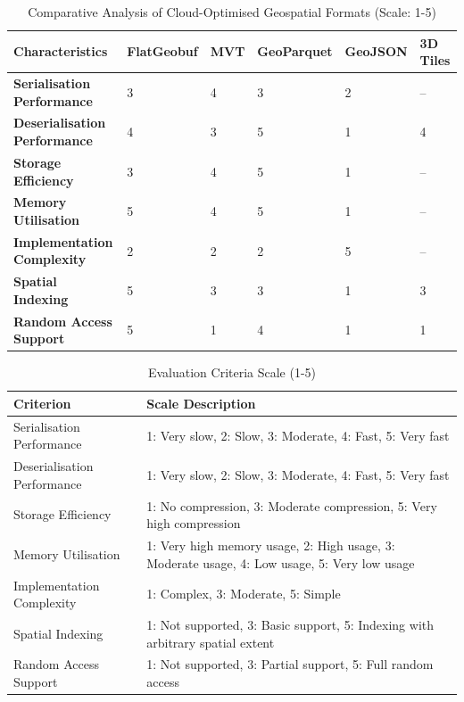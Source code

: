 \begin{table}[htbp]
  \centering
  \caption{Comparative Analysis of Cloud-Optimised Geospatial Formats (Scale: 1-5)}
  \label{tab:format-comparison}
  \footnotesize
  \begin{tabular}{p{3cm}|p{1.8cm}|p{1.8cm}|p{1.8cm}|p{1.8cm}|p{1.8cm}}
    \hline
    \textbf{Characteristics} & \textbf{FlatGeobuf} & \textbf{MVT} & \textbf{GeoParquet} & \textbf{GeoJSON} & \textbf{3D Tiles} \\
    \hline
    \textbf{Serialisation Performance} & 3 & 4 & 3 & 2 & -- \\
    \hline
    \textbf{Deserialisation Performance} & 4 & 3 & 5 & 1 & 4\footnotemark[1] \\
    \hline
    \textbf{Storage Efficiency} & 3 & 4 & 5 & 1 & -- \\
    \hline
    \textbf{Memory Utilisation} & 5 & 4 & 5 & 1 & -- \\
    \hline
    \textbf{Implementation Complexity} & 2 & 2 & 2 & 5 & -- \\
    \hline
    \textbf{Spatial Indexing} & 5 & 3\footnotemark[2] & 3\footnotemark[3] & 1 & 3\footnotemark[4] \\
    \hline
    \textbf{Random Access Support} & 5 & 1 & 4 & 1 & 1 \\
    \hline
  \end{tabular}
\end{table}


\begin{table}[htbp]
  \caption{Evaluation Criteria Scale (1-5)}
  \label{tab:criteria-scale}
  \begin{tabular}{p{3cm}|p{12cm}}
    \hline
    \textbf{Criterion} & \textbf{Scale Description} \\
    \hline
    Serialisation Performance & 1: Very slow, 2: Slow, 3: Moderate, 4: Fast, 5: Very fast \\
    \hline
    Deserialisation Performance & 1: Very slow, 2: Slow, 3: Moderate, 4: Fast, 5: Very fast \\
    \hline
    Storage Efficiency & 1: No compression, 3: Moderate compression, 5: Very high compression \\
    \hline
    Memory Utilisation & 1: Very high memory usage, 2: High usage, 3: Moderate usage, 4: Low usage, 5: Very low usage \\
    \hline
    Implementation Complexity & 1: Complex, 3: Moderate, 5: Simple \\
    \hline
    Spatial Indexing & 1: Not supported, 3: Basic support, 5: Indexing with arbitrary spatial extent \\
    \hline
    Random Access Support & 1: Not supported, 3: Partial support, 5: Full random access \\
    \hline
  \end{tabular}
\end{table}